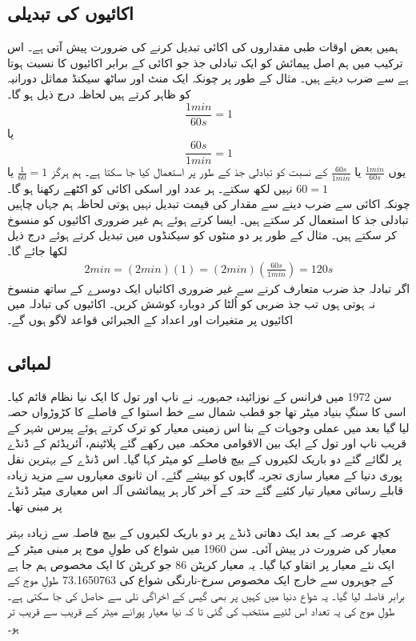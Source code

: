 	\subsection{اکائیوں کی تبدیلی}
	ہمیں بعض اوقات طبی مقداروں کی اکائی تبدیل کرنے کی ضرورت پیش آتی ہے۔ اس ترکیب میں ہم اصل پیمائش کو ایک تبادلی جذ جو اکائی کے برابر اکائیوں کا نسبت ہوتا ہے سے ضرب دیتے ہیں۔ مثال کے طور پر چونکہ ایک منٹ اور ساٹھ سیکنڈ مماثل دورانیہ کو ظاہر کرتے ہیں لحاظہ درج ذیل ہو گا۔
	\[\frac{1 min}{60 s} = 1\]
	یا
	\[\frac{60 s}{1 min} = 1\]
	یوں \(\frac{1 min}{60 s}\) یا \(\frac{60 s}{1 min}\) کے نسبت کو تبادلی جذ کے طور پر استعمال کیا جا سکتا ہے۔ ہم ہرگز \(\frac{1}{60}=1\) یا \(60 = 1\) نہیں لکھ سکتے۔ ہر عدد اور اسکی اکائی کو اکٹھے رکھنا ہو گا۔\\چونکہ اکائی سے ضرب دینے سے مقدار کی قیمت تبدیل نہیں ہوتی لحاظہ ہم جہاں چاہیں تبادلی جذ کا استعمال کر سکتے ہیں۔ ایسا کرتے ہوئے ہم غیر ضروری اکائیوں کو منسوخ کر سکتے ہیں۔ مثال کے طور پر دو منٹوں کو سیکنڈوں میں تبدیل کرتے ہوئے درج ذیل لکھا جائے گا۔
	\begin{align}
		2 min = (2 min)(1) = (2 min)(\frac{60 s}{1 min}) = 120 s
	\end{align}
	اگر تبادلہ جذ ضرب متعارف  کرنے سے غیر  ضروری  اکائیاں ایک دوسرے کے ساتھ منسوخ نہ ہوتی ہوں تب جذ ضربی کو اُلٹا کر دوبارہ کوشش کریں۔ اکائیوں کی تبادلہ میں اکائیوں پر متغیرات اور اعداد کے الجبرائی قواعد لاگو ہوں گے۔
	\subsection{لمبائی}
	سن 1972 میں فرانس کے نوزائیدہ جمہوریہ نے ناپ اور تول کا ایک نیا نظام قائم کیا۔ اسی کا سنگِ بنیاد میٹر تھا جو قطب شمال سے خط استوا کے فاصلے کا کڑوڑواں حصہ لیا گیا بعد میں عملی وجوہات کے بنا اس زمینی معیار کو ترک کرتے ہوئے پیرس شہر کے قریب ناپ اور تول کے ایک بین الاقوامی محکمہ میں رکھے گئے پلاٹینم، آئریڈئم کے ڈنڈے پر لگائے گئے دو باریک لکیروں کے بیچ فاصلے کو میٹر کہا گیا۔ اس ڈنڈے کے بہترین نقل پوری دنیا کے معیار سازی تجربہ گاہوں کو بیشے گئے۔ ان ثانوی معیاروں سے مزید زیادہ قابلے رسائی معیار تیار کئیے گئے حتہ کے آخر کار ہر پیمائشی آلہ اس معیاری میٹر ڈنڈے پر مبنی تھا۔
	
	کچھ عرصہ کے بعد ایک دھاتی ڈنڈے پر دو باریک لکیروں کے بیچ فاصلہ سے زیادہ بہتر معیار کی ضرورت در پیش آئی۔ سن 1960 میں شواع کی طولِ موج پر مبنی میٹر کے ایک نئے معیار پر اتقاو کیا گیا۔ یہ معیار کرپٹن 86 جو کرپٹن کا ایک مخصوص ہم جا ہے کے جوہروں سے خارج ایک مخصوص سرخ-نارنگی شواع کی 73.1650763 طولِ موج کے برابر فاصلہ لیا گیا۔ یہ شواع دنیا میں کہیں پر بھی گیس کے اخراگی نلی سے حاصل کی جا سکتی ہے۔ طولِ موج کی یہ تعداد اس لئیے منتخب کی گئی تا کہ نیا معیار پورانے میٹر کے قریب سے قریب تر ہو۔
	
